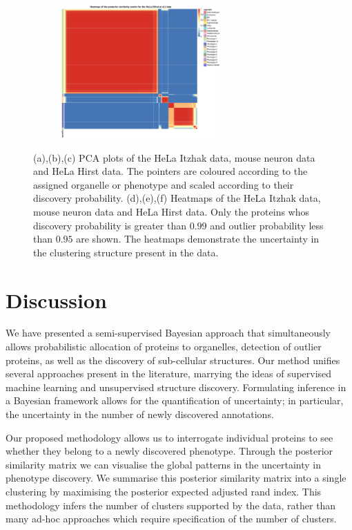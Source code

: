 \documentclass[12pt,english]{article}
\begin{document}
\begin{figure}
	\begin{subfigure}[t]{0.5\textwidth}
		\centering
		\includegraphics[height=2in]{heatmapHirst.pdf}
		\caption{}
	\end{subfigure}
	\caption{(a),(b),(c) PCA plots of the HeLa Itzhak data, mouse neuron data and HeLa Hirst data. The pointers are coloured according to the assigned organelle or phenotype and scaled according to their discovery probability. (d),(e),(f) Heatmaps of the HeLa Itzhak data, mouse neuron data and HeLa Hirst data. Only the proteins whos discovery probability is greater than $0.99$ and outlier probability less than $0.95$ are shown. The heatmaps demonstrate the uncertainty in the clustering structure present in the data.}
	\label{figure:DOM}
\end{figure}

\clearpage 
\section{Discussion}
We have presented a semi-supervised Bayesian approach that simultaneously allows probabilistic allocation of proteins to organelles, detection of outlier proteins, as well as the discovery of sub-cellular structures. Our method unifies several approaches present in the literature, marrying the ideas of supervised machine learning and unsupervised structure discovery. Formulating inference in a Bayesian framework allows for the quantification of uncertainty; in particular, the uncertainty in the number of newly discovered annotations.

Our proposed methodology allows us to interrogate individual proteins to see whether they belong to a newly discovered phenotype. Through the posterior similarity matrix we can visualise the global patterns in the uncertainty in phenotype discovery. We summarise this posterior similarity matrix into a single clustering by maximising the posterior expected adjusted rand index. This methodology infers the number of clusters supported by the data, rather than many ad-hoc approaches which require specification of the number of clusters.
\end{document}

